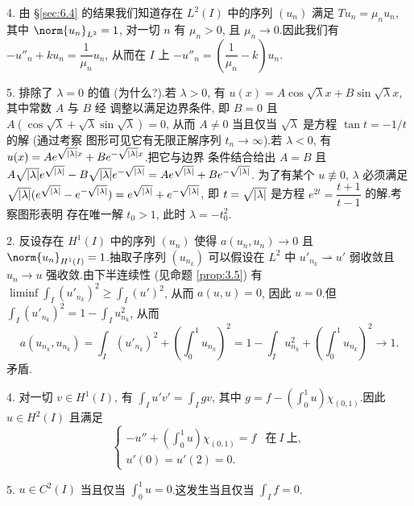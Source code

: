 4. 由 \S \ref{sec:6.4} 的结果我们知道存在 $L^2(I)$ 中的序列 $(u_n)$ 满足
$Tu_n=\mu_nu_n$, 其中 $\norm{u_n}_{L^2}=1$, 对一切 $n$ 有 $\mu_n>0$, 且
$\mu_n\to0$.因此我们有 $-u''_n+ku_n=\dfrac{1}{\mu_n}u_n$, 从而在 $I$ 上
$-u''_n=\left(\dfrac{1}{\mu_n}-k\right)u_n$.

5. 排除了 $\lambda=0$ 的值 (为什么?).若 $\lambda>0$, 有
$u(x)=A\cos\sqrt{\lambda}x+B\sin\sqrt{\lambda}x$, 其中常数 $A$ 与 $B$ 经
调整以满足边界条件, 即 $B=0$ 且 $A(\cos\sqrt{\lambda}+\sqrt{\lambda}\sin\sqrt{\lambda})=0$,
从而 $A\ne0$ 当且仅当 $\sqrt{\lambda}$ 是方程 $\tan t=-1/t$ 的解 (通过考察
图形可见它有无限正解序列 $t_n\to\infty$).若 $\lambda<0$, 有
$u(x)=Ae^{\sqrt{\left|\lambda\right|}x}+Be^{-\sqrt{\left|\lambda\right|}x}$.把它与边界
条件结合给出 $A=B$ 且
$A\sqrt{\left|\lambda\right|}e^{\sqrt{\left|\lambda\right|}}-B\sqrt{\left|\lambda\right|}e^{-\sqrt{\left|\lambda\right|}}=Ae^{\sqrt{\left|\lambda\right|}}+Be^{-\sqrt{\left|\lambda\right|}}$.
为了有某个 $u\not\equiv0$, $\lambda$ 必须满足
$\sqrt{\left|\lambda\right|}(e^{\sqrt{\left|\lambda\right|}}-e^{-\sqrt{\left|\lambda\right|}})=e^{\sqrt{\left|\lambda\right|}}+e^{-\sqrt{\left|\lambda\right|}}$,
即 $t=\sqrt{\left|\lambda\right|}$ 是方程 $e^{2t}=\dfrac{t+1}{t-1}$ 的解.考察图形表明
存在唯一解 $t_0>1$, 此时 $\lambda=-t_0^2$.


2. 反设存在 $H^1(I)$ 中的序列 $(u_n)$ 使得 $a(u_n,u_n)\to0$ 且
$\norm{u_n}_{H^1(I)}=1$.抽取子序列 $(u_{n_k})$ 可以假设在 $L^2$ 中
$u'_{n_k}\rightharpoonup u'$ 弱收敛且 $u_n\to u$ 强收敛.由下半连续性 (见命题
 \ref{prop:3.5}) 有 $\liminf\int_I(u'_{n_k})^2\ge\int_I(u')^2$, 从而
$a(u,u)=0$, 因此 $u=0$.但 $\int_I(u'_{n_k})^2=1-\int_I u_{n_k}^2$, 从而
\begin{equation*}
a(u_{n_k},u_{n_k})=\int_I(u'_{n_k})^2+\left(\int_0^1u_{n_k}\right)^2
=1-\int_I u_{n_k}^2+\left(\int_0^1u_{n_k}\right)^2\to1.
\end{equation*}
矛盾.

4. 对一切 $v\in H^1(I)$, 有 $\int_Iu'v'=\int_Igv$, 其中
$g=f-(\int_0^1u)\chi_{(0,1)}$.因此 $u\in H^2(I)$ 且满足
\begin{equation*}
\begin{cases}
-u''+(\int_0^1u)\chi_{(0,1)}=f & \text{在}\ I\ \text{上},\\
u'(0)=u'(2)=0.
\end{cases}
\end{equation*}

5. $u\in C^2(I)$ 当且仅当 $\int_0^1u=0$.这发生当且仅当 $\int_If=0$.

